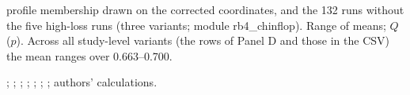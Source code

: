 \begin{table}[tp]
\begin{tablenotes}
profile membership drawn on the corrected coordinates, and the 132 runs without the five high-loss runs (three variants; module rb4\_chinflop). Range of means; $Q$ ($p$). Across all study-level variants (the rows of Panel D and those in the CSV) the mean ranges over 0.663--0.700.
\end{tablenotes}

\begin{tablenotes}[Source]
\citet{hoffmann2022training}; \citet{besiroglu2024chinchilla}; \citet{grattafiori2024llama}; \citet{czech2026llama3isoflop}; \citet{marin2026ladders}; \citet{porian2024resolving}; \citet{li2025predictableb}; authors' calculations.
\end{tablenotes}
\end{table}
